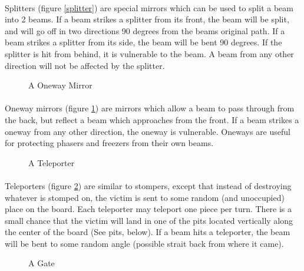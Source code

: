 \paragraph[]{}
Splitters (figure \ref{splitter}) are special mirrors which can be
used to split a beam into 2 beams.  If a beam strikes a splitter from
its front, the beam will be split, and will go off in two directions
90 degrees from the beams original path.  If a beam strikes a splitter
from its side, the beam will be bent 90 degrees.  If the splitter is
hit from behind, it is vulnerable to the beam.  A beam from any other
direction will not be affected by the splitter.

\newpage

\begin{figure}[htb]
	\caption{A Oneway Mirror}
	\label{oneway}
\end{figure}

\paragraph[]{}

Oneway mirrors (figure \ref{oneway}) are mirrors which allow a beam to
pass through from the back, but reflect a beam which approaches from
the front.  If a beam strikes a oneway from any other direction, the
oneway is vulnerable.  Oneways are useful for protecting phasers and
freezers from their own beams.

\begin{figure}[htb]
	\caption{A Teleporter}
	\label{teleporter}
\end{figure}

\paragraph[]{}
Teleporters (figure \ref{teleporter}) are similar to stompers, except
that instead of destroying whatever is stomped on, the victim is sent
to some random (and unoccupied) place on the board.  Each teleporter
may teleport one piece per turn.  There is a small chance that the
victim will land in one of the pits located vertically along the
center of the board (See pits, below).  If a beam hits a teleporter,
the beam will be bent to some random angle (possible strait back from
where it came).

\begin{figure}[htb]
	\caption{A Gate}
	\label{gate}
\end{figure}

